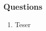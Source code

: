 \documentclass{beamer}
\begin{document}
\begin{frame}
	\frametitle{Questions}
	\begin{enumerate}[$\bullet$]
		\item Teser
	\end{enumerate}

\end{frame}
%
\end{document}
